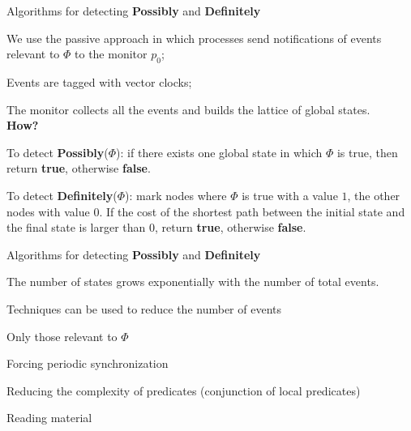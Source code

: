 \begin{frame}{Algorithms for detecting {\bf Possibly} and {\bf Definitely}}

\BI
\item We use the passive approach in which processes send notifications of events 
  relevant to $\Phi$ to the monitor $p_0$;
\item Events are tagged with vector clocks; 
\item The monitor collects all the events and builds the lattice of global
  states.\\
  {\bf How?}
\item To detect {\bf Possibly}($\Phi$): if there exists one 
  global state in which $\Phi$ is true, then return {\bf true}, otherwise
  {\bf false}.
\item To detect {\bf Definitely}($\Phi$): mark nodes where $\Phi$ is true
  with a value $1$, the other nodes with value $0$. If the cost of the 
  shortest path between the initial state and the final state is larger
  than $0$, return {\bf true}, otherwise
  {\bf false}.
\EI

\end{frame}

\begin{frame}{Algorithms for detecting {\bf Possibly} and {\bf Definitely}}

\BIL
\item The number of states grows exponentially with the number of total
  events. 
\item Techniques can be used to reduce the number of events
\BI
\item Only those relevant to $\Phi$
\item Forcing periodic synchronization
\item Reducing the complexity of predicates (conjunction of local predicates)
\EI
\EIL

\end{frame}

\nocite{ozalp93consistent}

\begin{frame}{Reading material}

{\footnotesize

  
}

\end{frame}




